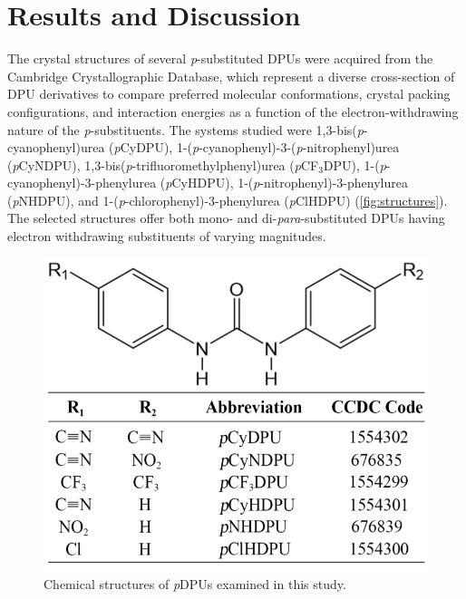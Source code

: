 \section{Results and Discussion}
The crystal structures of several \textit{p}-substituted DPUs were acquired from the Cambridge Crystallographic Database, which represent a diverse cross-section of DPU derivatives to compare preferred molecular conformations, crystal packing configurations, and interaction energies as a function of the electron-withdrawing nature of the \textit{p}-substituents. The systems studied were 1,3-bis(\textit{p}-cyanophenyl)urea (\textit{p}CyDPU), 1-(\textit{p}-cyanophenyl)-3-(\textit{p}-nitrophenyl)urea (\textit{p}CyNDPU), 1,3-bis(\textit{p}-trifluoromethylphenyl)urea (\textit{p}CF$_{3}$DPU), 1-(\textit{p}-cyanophenyl)-3-phenylurea (\textit{p}CyHDPU), 1-(\textit{p}-nitrophenyl)-3-phenylurea (\textit{p}NHDPU), and 1-(\textit{p}-chlorophenyl)-3-phenylurea (\textit{p}ClHDPU) (\autoref{fig:structures}). The selected structures offer both mono- and di-\textit{para}-substituted DPUs having electron withdrawing substituents of varying magnitudes.


\begin{figure}[h!]
    \centering
    \includegraphics[width=0.8\linewidth]{figures/pub3/Picture2.jpg}
    \caption{Chemical structures of \textit{p}DPUs examined in this study.}\label{fig:structures}
\end{figure}

